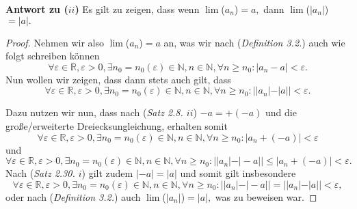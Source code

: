 \begin{lsg}
    \textbf{Antwort zu ($ii$)}
        Es gilt zu zeigen, dass wenn $\lim$($a_n$)$=a,$ dann $\lim$($|a_n|$)$=|a|.$
    
    \begin{proof}
        Nehmen wir also $\lim$($a_n$)$=a$ an, was wir nach (\textit{Definition 3.2.}) auch wie folgt schreiben k\"onnen $$\forall \varepsilon \in \mathbb{R}, \varepsilon > 0, \exists n_0 = n_0(\varepsilon) \in \mathbb{N}, n \in \mathbb{N}, \forall n \ge n_0 : |a_n - a| < \varepsilon.$$ 
        Nun wollen wir zeigen, dass dann stets auch gilt, dass$$\forall \varepsilon \in \mathbb{R}, \varepsilon > 0, \exists n_0 = n_0(\varepsilon) \in \mathbb{N}, n \in \mathbb{N}, \forall n \ge n_0 : ||a_n| - |a|| < \varepsilon.$$
    
        Dazu nutzen wir nun, dass nach (\textit{Satz 2.8. $ii$}) $-a = +(-a)$ und die gro{\ss}e/erweiterte Dreiecksungleichung, erhalten somit $$\forall \varepsilon \in \mathbb{R}, \varepsilon > 0, \exists n_0 = n_0(\varepsilon) \in \mathbb{N}, n \in \mathbb{N}, \forall n \ge n_0 : |a_n + (-a)| < \varepsilon$$und $$\forall \varepsilon \in \mathbb{R}, \varepsilon > 0, \exists n_0 = n_0(\varepsilon) \in \mathbb{N}, n \in \mathbb{N}, \forall n \ge n_0 : ||a_n|-|-a|| \le |a_n + (-a)| < \varepsilon.$$Nach (\textit{Satz 2.30. $i$}) gilt zudem $|-a| = |a|$ und somit gilt insbesondere $$\forall \varepsilon \in \mathbb{R}, \varepsilon > 0, \exists n_0 = n_0(\varepsilon) \in \mathbb{N}, n \in \mathbb{N}, \forall n \ge n_0 : ||a_n|-|-a|| = ||a_n|-|a|| < \varepsilon,$$oder nach (\textit{Definition 3.2.}) auch $\lim$($|a_n|$)$=|a|,$ was zu beweisen war.
    \end{proof}
\end{lsg}

